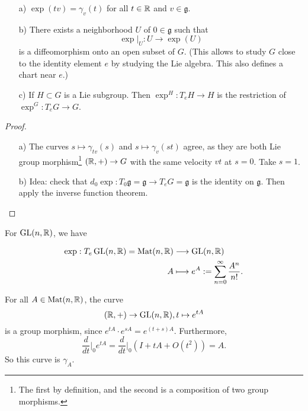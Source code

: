 \begin{prop}
    \begin{itemize}
        \item[a)] $\exp(tv) = \gamma_v(t)$ for all $t\in \mathbb{R}$ and $v\in \mathfrak g$.
        \item[b)] There exists a neighborhood $U$ of $0 \in \mathfrak g$ such that 
            \[
                \exp|_U: U \to  \exp(U)             \] 
            is a diffeomorphism onto an open subset of $G$. (This allows to study $G$ close to the identity element $e$ by studying the Lie algebra. This also defines a chart near $e$.)
        \item[c)] If $H \subset G$ is a Lie subgroup.
            Then $\exp^{H}: T_eH \to  H$ is the restriction of $\exp^{G}: T_eG \to G$.
    \end{itemize}
\end{prop}
\begin{proof}
    \begin{itemize}
        \item[a)] The curves $s \mapsto  \gamma_{tv}(s)$ and $s \mapsto \gamma_v(st)$   agree, as they are both Lie group morphism\footnote{The first by definition, and the second is a composition of two group morphisms.}  $(\mathbb{R}, +) \to  G$ with the same velocity $vt$ at $s = 0$. Take $s = 1$.
        \item[b)] Idea: check that $d_0 \exp: T_0 \mathfrak  g=\mathfrak  g \to  T_e G=\mathfrak  g$ is the identity on $\mathfrak  g$. Then apply the
            inverse function theorem.
    \end{itemize}
\end{proof}
\begin{eg}
    For $\operatorname{GL}(n, \mathbb{R})$, we have

    \begin{align*}
        \exp: T_e \operatorname{GL}(n, \mathbb{R}) = \operatorname{Mat}(n, \mathbb{R})&\longrightarrow  \operatorname{GL}(n, \mathbb{R})\\
         A&\longmapsto  e^{A} := \sum_{n=0}^{\infty} \frac{A^{n}}{n!}
    .\end{align*}
\end{eg}
\begin{explanation}
    For all $A \in  \operatorname{Mat}(n, \mathbb{R})$, the curve
    \[
        (\mathbb{R}, +) \to  \operatorname{GL}(n, \mathbb{R}), t \mapsto  e^{tA}
    \] 
  is a group morphism, since $e^{tA} \cdot e^{s A} = e^{(t + s) A}$.
    Furthermore, 
    \[
        \frac{d}{dt}\Big|_0 e^{tA} = \frac{d}{dt}\Big|_0 (I + tA + O(t^2)) = A
    .\] 
    So this curve is $\gamma_A$.
\end{explanation}

